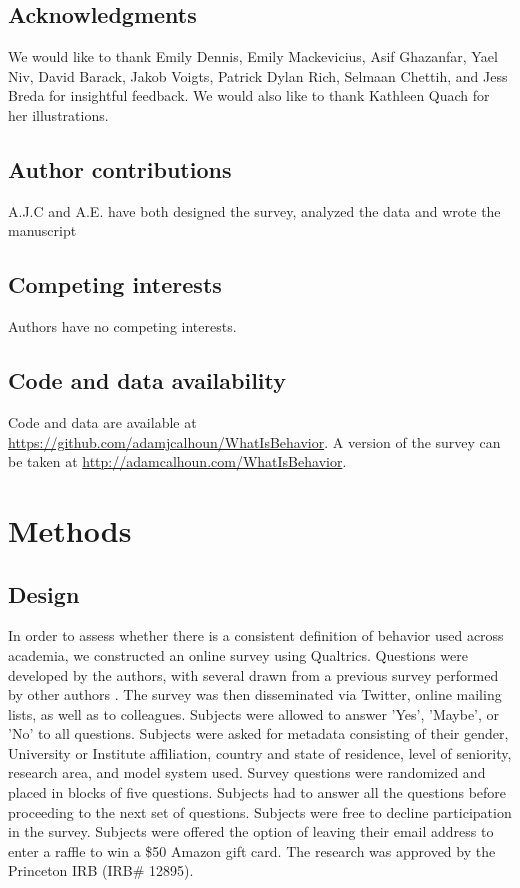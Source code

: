 \documentclass[a4paper, 11pt]{article}
\begin{document}
\subsection*{Acknowledgments}
We would like to thank Emily Dennis, Emily Mackevicius, Asif Ghazanfar, Yael Niv, David Barack, Jakob Voigts, Patrick Dylan Rich, Selmaan Chettih, and Jess Breda for insightful feedback. We would also like to thank Kathleen Quach for her illustrations.

\subsection*{Author contributions}
A.J.C and A.E. have both designed the survey, analyzed the data and wrote the manuscript

\subsection*{Competing interests}
Authors have no competing interests.

\subsection*{Code and data availability}
Code and data are available at \href{https://github.com/adamjcalhoun/WhatIsBehavior}{https://github.com/adamjcalhoun/WhatIsBehavior}. A version of the survey can be taken at \href{http://adamcalhoun.com/WhatIsBehavior}{http://adamcalhoun.com/WhatIsBehavior}.

\section*{Methods}
\subsection*{Design}
In order to assess whether there is a consistent definition of behavior used across academia, we constructed an online survey using Qualtrics. Questions were developed by the authors, with several drawn from a previous survey performed by other authors \cite{levitis2009behavioural}. The survey was then disseminated via Twitter, online mailing lists, as well as to colleagues. Subjects were allowed to answer 'Yes', 'Maybe', or 'No' to all questions. Subjects were asked for metadata consisting of their gender, University or Institute affiliation, country and state of residence, level of seniority, research area, and model system used. Survey questions were randomized and placed in blocks of five questions. Subjects had to answer all the questions before proceeding to the next set of questions. Subjects were free to decline participation in the survey. Subjects were offered the option of leaving their email address to enter a raffle to win a \$50 Amazon gift card. The research was approved by the Princeton IRB (IRB\# 12895).
\end{document}
